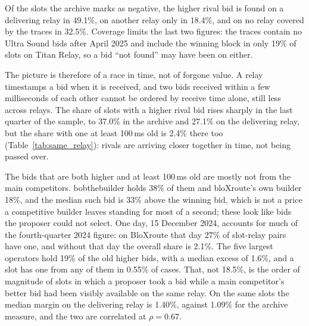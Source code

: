 \documentclass[11pt]{article}
\begin{document}
Of the slots the archive marks as negative, the higher rival bid is found on
a delivering relay in 49.1\%, on another relay only in 18.4\%, and on no
relay covered by the traces in 32.5\%. Coverage limits the last two figures:
the traces contain no Ultra Sound bids after April 2025 and include the
winning block in only 19\% of slots on Titan Relay, so a bid ``not found''
may have been on either.

The picture is therefore of a race in time, not of forgone value. A relay
timestamps a bid when it is received, and two bids received within a few
milliseconds of each other cannot be ordered by receive time alone, still
less across relays. The share of slots with a higher rival bid rises sharply
in the last quarter of the sample, to 37.0\% in the archive and 27.1\% on
the delivering relay, but the share with one at least 100\,ms old is 2.4\%
there too (Table~\ref{tab:same_relay}): rivals are arriving closer together
in time, not being passed over.

The bids that are both higher and at least 100\,ms old are mostly not from
the main competitors. bobthebuilder holds 38\% of them and bloXroute's own
builder 18\%, and the median such bid is 33\% above the winning bid, which
is not a price a competitive builder leaves standing for most of a second;
these look like bids the proposer could not select. One day, 15 December
2024, accounts for much of the fourth-quarter 2024 figure: on BloXroute that
day 27\% of slot-relay pairs have one, and without that day the overall
share is 2.1\%. The five largest operators hold 19\% of the old higher bids,
with a median excess of 1.6\%, and a slot has one from any of them in 0.55\%
of cases. That, not 18.5\%, is the order of magnitude of slots in which a
proposer took a bid while a main competitor's better bid had been visibly
available on the same relay. On the same slots the median margin on the
delivering relay is 1.40\%, against 1.09\% for the archive measure, and the
two are correlated at $\rho = 0.67$.
\end{document}

